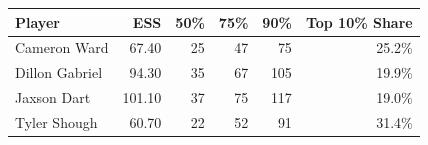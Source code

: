 \begin{tabular}{l|r|r|r|r|r}
Player & ESS & 50\% & 75\% & 90\% & Top 10\% Share \\
  \hline
Cameron Ward & 67.40 &  25 &  47 &  75 & 25.2\% \\ 
  Dillon Gabriel & 94.30 &  35 &  67 & 105 & 19.9\% \\ 
  Jaxson Dart & 101.10 &  37 &  75 & 117 & 19.0\% \\ 
  Tyler Shough & 60.70 &  22 &  52 &  91 & 31.4\% \\ 
\end{tabular}
